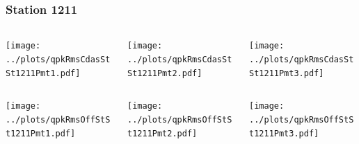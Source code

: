 \documentclass[aspectratio=169]{beamer}
\begin{document}
\begin{frame} 
  \frametitle{Station 1211}
  \begin{center}
    \begin{columns}
      \begin{column}{0.33\textwidth}
        \texttt{[image: ../plots/qpkRmsCdasStSt1211Pmt1.pdf]}
      \end{column}
      \begin{column}{0.33\textwidth}
        \texttt{[image: ../plots/qpkRmsCdasStSt1211Pmt2.pdf]}
      \end{column}
      \begin{column}{0.33\textwidth}
        \texttt{[image: ../plots/qpkRmsCdasStSt1211Pmt3.pdf]}
      \end{column}
    \end{columns}
  \end{center}

  \begin{center}
    \begin{columns}
      \begin{column}{0.33\textwidth}
        \texttt{[image: ../plots/qpkRmsOffStSt1211Pmt1.pdf]}
      \end{column}
      \begin{column}{0.33\textwidth}
        \texttt{[image: ../plots/qpkRmsOffStSt1211Pmt2.pdf]}
      \end{column}
      \begin{column}{0.33\textwidth}
        \texttt{[image: ../plots/qpkRmsOffStSt1211Pmt3.pdf]}
      \end{column}
    \end{columns}
  \end{center}
\end{frame}
\end{document}
